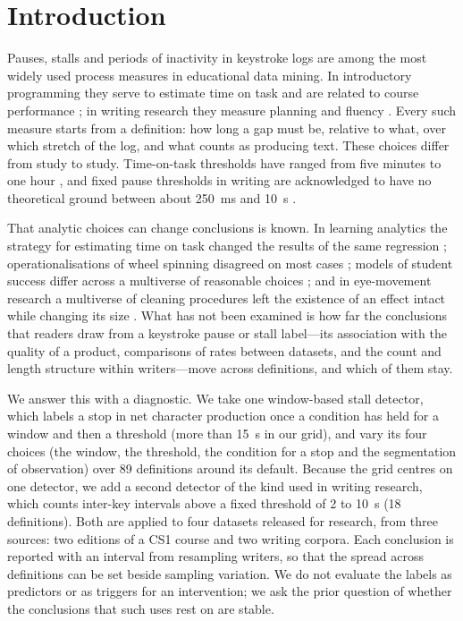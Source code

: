 \section{Introduction}
\label{sec:intro}

Pauses, stalls and periods of inactivity in keystroke logs are among the most widely used process measures in
educational data mining. In introductory programming they serve to estimate time on task
\cite{hart2023time,hart2025time,edwards2022engagement} and are related to course performance
\cite{shrestha2022pausing,koutcheme2026keystroke}; in writing research they measure planning and fluency
\cite{roeser2024disfluencies,torrance2024methods,chukharev2014pauses,guo2020scenario}. Every such measure starts from a
definition: how long a gap must be, relative to what, over which stretch of the log, and what counts as producing text.
These choices differ from study to study. Time-on-task thresholds have ranged from five minutes to one hour
\cite{hart2025time}, and fixed pause thresholds in writing are acknowledged to have no theoretical ground between about
250~ms and 10~s \cite{torrance2024methods}.

That analytic choices can change conclusions is known. In learning analytics the strategy for estimating time on task
changed the results of the same regression \cite{kovanovic2015time}; operationalisations of wheel spinning disagreed on
most cases \cite{zhang2019wheel}; models of student success differ across a multiverse of reasonable choices
\cite{tang2025multiverse}; and in eye-movement research a multiverse of cleaning procedures left the existence of an
effect intact while changing its size \cite{godwin2025multiverse}. What has not been examined is how far the conclusions
that readers draw from a keystroke pause or stall label---its association with the quality of a product, comparisons of
rates between datasets, and the count and length structure within writers---move across definitions, and which of them
stay.

We answer this with a diagnostic. We take one window-based stall detector, which labels a stop in net character
production once a condition has held for a window and then a threshold (more than 15~s in our grid), and vary its four
choices (the window, the threshold, the condition for a stop and the segmentation of observation) over 89 definitions
around its default. Because the grid centres on one detector, we add a second detector of the kind used in writing
research, which counts inter-key intervals above a fixed threshold of 2 to 10~s (18 definitions). Both are applied to
four datasets released for research, from three sources: two editions of a CS1 course and two writing corpora. Each
conclusion is reported with an interval from resampling writers, so that the spread across definitions can be set
beside sampling variation. We do not evaluate the labels as predictors or as triggers for an intervention; we ask the
prior question of whether the conclusions that such uses rest on are stable.

